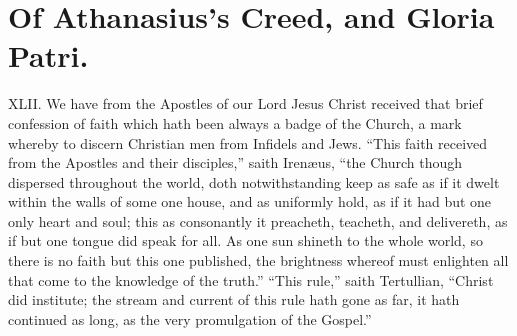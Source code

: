 \section*{Of Athanasius’s Creed, and Gloria Patri.}
XLII. We have from the Apostles of our Lord Jesus Christ received that brief confession of faith which hath been  always a badge of the Church, a mark whereby to discern Christian men from Infidels and Jews. “This faith received from the Apostles and their disciples,” saith Irenæus, “the Church though dispersed throughout the world, doth notwithstanding keep as safe as if it dwelt within the walls of some one house, and as uniformly hold, as if it had but one only heart and soul; this as consonantly it preacheth, teacheth, and delivereth, as if but one tongue did speak for all. As one sun shineth to the whole world, so there is no faith but this one published, the brightness whereof must enlighten all that come to the knowledge of the truth.” “This rule,” saith Tertullian, “Christ did institute; the stream and current of this rule hath gone as far, it hath continued as long, as the very promulgation of the Gospel.”
